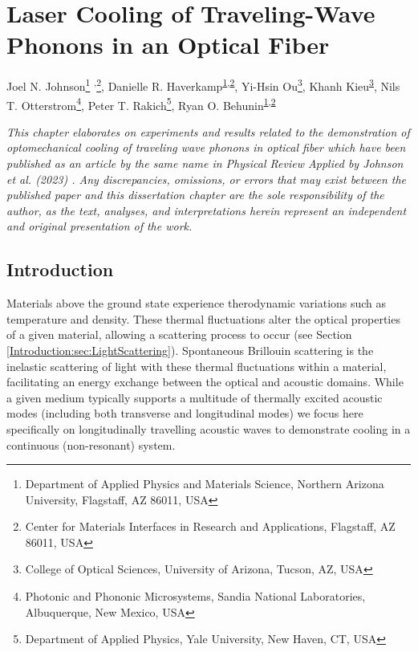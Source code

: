 \setcounter{rownumber}{0}
\chapter{Laser Cooling of Traveling-Wave Phonons in an Optical Fiber}
\label{ch:Cooling}
\acresetall

Joel N. Johnson\footnote{\label{Cooling-NAU}
Department of Applied Physics and Materials Science, Northern Arizona University, Flagstaff, AZ 86011, USA}%
\textsuperscript{,}\footnote{\label{Cooling-MIRA}
Center for Materials Interfaces in Research and Applications, Flagstaff, AZ 86011, USA},
Danielle R. Haverkamp\textsuperscript{\ref{Cooling-NAU},\ref{Cooling-MIRA}},
Yi-Hsin Ou\footnote{\label{Cooling-UofA}
College of Optical Sciences, University of Arizona, Tucson, AZ, USA},
Khanh Kieu\textsuperscript{\ref{Cooling-UofA}},
Nils T. Otterstrom\footnote{\label{Cooling-Sandia}
Photonic and Phononic Microsystems, Sandia National Laboratories, Albuquerque, New Mexico, USA},
Peter T. Rakich\footnote{\label{Cooling-Yale}
Department of Applied Physics, Yale University, New Haven, CT, USA},
Ryan O. Behunin\textsuperscript{\ref{Cooling-NAU},\ref{Cooling-MIRA}}

\hfill

\textit{This chapter elaborates on experiments and results related to the demonstration of optomechanical cooling of traveling wave phonons in optical fiber which have been published as an article by the same name in Physical Review Applied by Johnson et al. (2023) \cite{johnson2023laser}. Any discrepancies, omissions, or errors that may exist between the published paper and this dissertation chapter are the sole responsibility of the author, as the text, analyses, and interpretations herein represent an independent and original presentation of the work.}


\section{Introduction}
\label{Cooling:sec:Introduction}

Materials above the ground state experience therodynamic variations such as temperature and density. These thermal fluctuations alter the optical properties of a given material, allowing a scattering process to occur (see Section \ref{Introduction:sec:LightScattering}). Spontaneous Brillouin scattering is the inelastic scattering of light with these thermal fluctuations within a material, facilitating an energy exchange between the optical and acoustic domains. While a given medium typically supports a multitude of thermally excited acoustic modes (including both transverse and longitudinal modes) we focus here specifically on longitudinally travelling acoustic waves to demonstrate cooling in a continuous (non-resonant) system.


